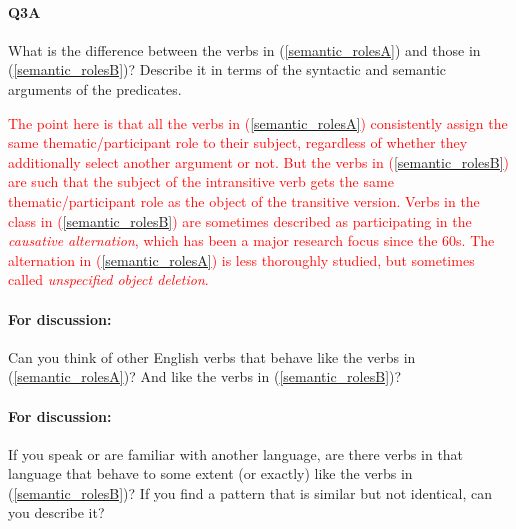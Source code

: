 \documentclass{article}
\begin{document}
\paragraph{Q3A} What is the difference between the verbs in (\ref{semantic_rolesA}) and those in (\ref{semantic_rolesB})? Describe it in terms of the syntactic and semantic arguments of the predicates.

\textcolor{red}{The point here is that all the verbs in (\ref{semantic_rolesA}) consistently assign the same thematic/participant role to their subject, regardless of whether they additionally select another argument or not.
But the verbs in (\ref{semantic_rolesB}) are such that the subject of the intransitive verb gets the same thematic/participant role as the object of the transitive version.
Verbs in the class in (\ref{semantic_rolesB}) are sometimes described as participating in the \emph{causative alternation}, which has been a major research focus since the 60s.
The alternation in (\ref{semantic_rolesA}) is less thoroughly studied, but sometimes called \emph{unspecified object deletion}.}

\paragraph{For discussion:} Can you think of other English verbs that behave like the verbs in (\ref{semantic_rolesA})? And like the verbs in (\ref{semantic_rolesB})?

\paragraph{For discussion:} If you speak or are familiar with another language, are there verbs in that language that behave to some extent (or exactly) like the verbs in (\ref{semantic_rolesB})? If you find a pattern that is similar but not identical, can you describe it?
\end{document}
